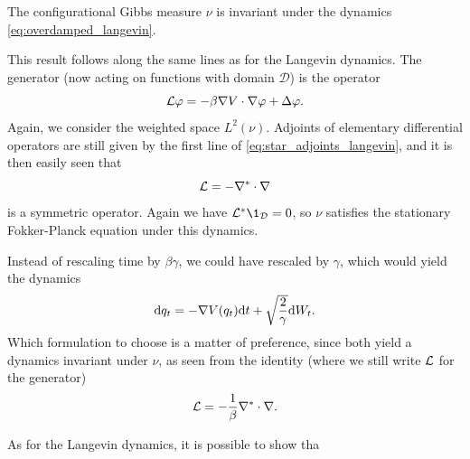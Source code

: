     \begin{prop}
        The configurational Gibbs measure $\nu$ is invariant under the dynamics \eqref{eq:overdamped_langevin}.
    \end{prop}

    This result follows along the same lines as for the Langevin dynamics. The generator (now acting on functions with domain $\mathcal D$) is the operator
    \begin{equation}
        \label{eq:overdamped_langevin_generator}
        \mathcal{L}\varphi=-\beta\nabla V\cdot \nabla\varphi + \Delta \varphi.
    \end{equation}
    Again, we consider the weighted space $L^2(\nu)$. Adjoints of elementary differential operators are still given by the first line of \eqref{eq:star_adjoints_langevin}, and it is then easily seen that
    \begin{equation}
        \label{eq:L_overdamped_symmetric}
        \mathcal{L}=-\nabla^*\cdot\nabla
    \end{equation}
    is a symmetric operator. Again we have $\cL^*\1_{\mathcal D}=0$, so $\nu$ satisfies the stationary Fokker-Planck equation under this dynamics.

    \begin{remark}
        Instead of rescaling time by $\beta\gamma$, we could have rescaled by $\gamma$, which would yield the dynamics
        \begin{equation}
            \label{eq:overdamped_langevin_alt}
            \mathrm{d} q_t=-\nabla V(q_t)\mathrm{d} t+\sqrt{\frac 2\gamma}\mathrm{d} W_t.
        \end{equation}
        Which formulation to choose is a matter of preference, since both yield a dynamics invariant under $\nu$, as seen from the identity (where we still write $\mathcal{L}$ for the generator)
        \[\mathcal{L}=-\frac1\beta\nabla^*\cdot\nabla.\]
    \end{remark}

    As for the Langevin dynamics, it is possible to show tha


